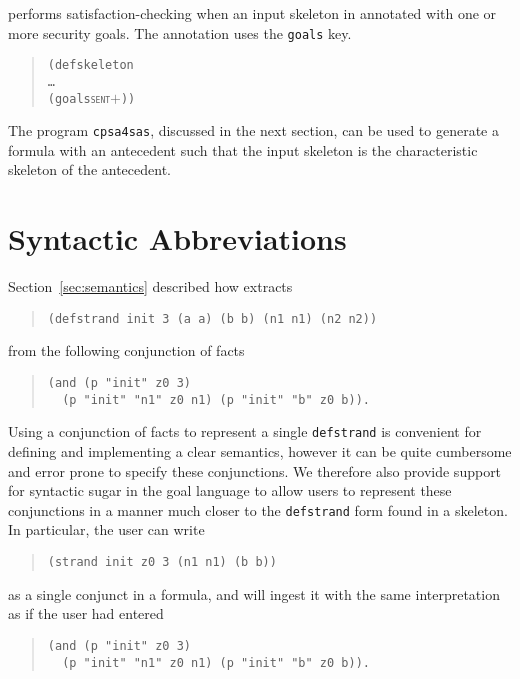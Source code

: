 {\cpsa} performs satisfaction-checking when an input skeleton in annotated
with one or more security goals.  The annotation uses the
\texttt{goals} key.

\begin{quote}
  \begin{alltt}
(defskeleton
   \ldots
   (goals \textsc{sent\ensuremath{+}}))
  \end{alltt}
\end{quote}

The program \texttt{cpsa4sas}, discussed in the next section, can be
used to generate a formula with an antecedent such that the input
skeleton is the characteristic skeleton of the antecedent.

\section{Syntactic Abbreviations}\label{sec:var syntax}
Section~\ref{sec:semantics} described how {\cpsa} extracts

\begin{quote}
\begin{verbatim}
(defstrand init 3 (a a) (b b) (n1 n1) (n2 n2))
\end{verbatim}
\end{quote}
from the following conjunction of facts
\begin{quote}
\begin{verbatim}
(and (p "init" z0 3)
  (p "init" "n1" z0 n1) (p "init" "b" z0 b)).
\end{verbatim}
\end{quote}

Using a conjunction of facts to represent a single \texttt{defstrand}
is convenient for defining and implementing a clear semantics, however
it can be quite cumbersome and error prone to specify these
conjunctions. We therefore also provide support for syntactic sugar in
the goal language to allow users to represent these conjunctions in a
manner much closer to the \texttt{defstrand} form found in a
skeleton. In particular, the user can write

\begin{quote}
\begin{verbatim}
(strand init z0 3 (n1 n1) (b b))
\end{verbatim}
\end{quote}
as a single conjunct in a formula, and {\cpsa} will ingest it with the
same interpretation as if the user had entered
\begin{quote}
\begin{verbatim}
(and (p "init" z0 3)
  (p "init" "n1" z0 n1) (p "init" "b" z0 b)).
\end{verbatim}
\end{quote}

